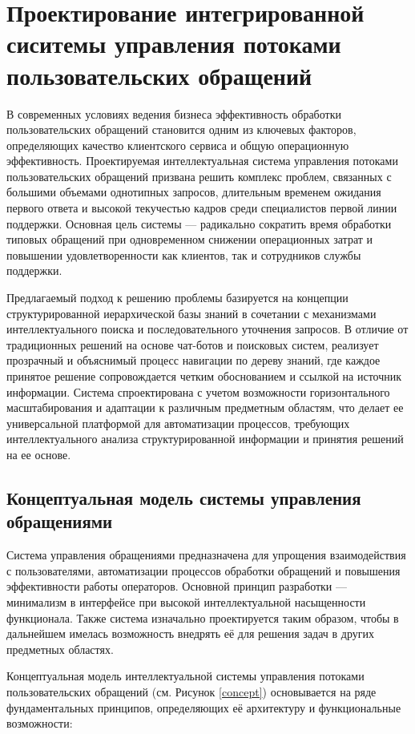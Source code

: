 \section{Проектирование интегрированной сиситемы управления потоками пользовательских обращений}
\label{sec:designing}

В современных условиях ведения бизнеса эффективность обработки пользовательских обращений становится одним из ключевых факторов, определяющих качество клиентского сервиса и общую операционную эффективность. Проектируемая интеллектуальная система управления потоками пользовательских обращений призвана решить комплекс проблем, связанных с большими объемами однотипных запросов, длительным временем ожидания первого ответа и высокой текучестью кадров среди специалистов первой линии поддержки. Основная цель системы — радикально сократить время обработки типовых обращений при одновременном снижении операционных затрат и повышении удовлетворенности как клиентов, так и сотрудников службы поддержки.

Предлагаемый подход к решению проблемы базируется на концепции структурированной иерархической базы знаний в сочетании с механизмами интеллектуального поиска и последовательного уточнения запросов. В отличие от традиционных решений на основе чат-ботов и поисковых систем, реализует прозрачный и объяснимый процесс навигации по дереву знаний, где каждое принятое решение сопровождается четким обоснованием и ссылкой на источник информации. Система спроектирована с учетом возможности горизонтального масштабирования и адаптации к различным предметным областям, что делает ее универсальной платформой для автоматизации процессов, требующих интеллектуального анализа структурированной информации и принятия решений на ее основе.

\subsection{Концептуальная модель системы управления обращениями}

Система управления обращениями предназначена для упрощения взаимодействия с пользователями, автоматизации процессов обработки обращений и повышения эффективности работы операторов. Основной принцип разработки — минимализм в интерфейсе при высокой интеллектуальной насыщенности функционала. Также система изначально проектируется таким образом, чтобы в дальнейшем имелась возможность внедрять её для решения задач в других предметных областях.

Концептуальная модель интеллектуальной системы управления потоками пользовательских обращений (см. Рисунок \ref{concept}) основывается на ряде фундаментальных принципов, определяющих её архитектуру и функциональные возможности:

